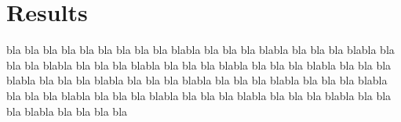 \section*{Results}
bla bla bla bla bla bla bla bla bla blabla bla bla bla blabla bla bla bla blabla bla bla bla blabla bla bla bla blabla bla bla bla blabla bla bla bla blabla bla bla bla blabla bla bla bla blabla bla bla bla blabla bla bla bla blabla bla bla bla blabla bla bla bla blabla bla bla bla blabla bla bla bla blabla bla bla bla blabla bla bla bla blabla bla bla bla bla